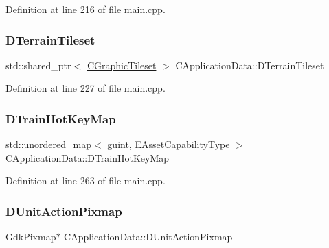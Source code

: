 Definition at line 216 of file main.\+cpp.

\hypertarget{classCApplicationData_acd9fb0d0ea35a6d93e8ec9212db8ef83}{}\label{classCApplicationData_acd9fb0d0ea35a6d93e8ec9212db8ef83} 
\subsubsection{\texorpdfstring{D\+Terrain\+Tileset}{DTerrainTileset}}
{\footnotesize\ttfamily std\+::shared\+\_\+ptr$<$ \hyperlink{classCGraphicTileset}{C\+Graphic\+Tileset} $>$ C\+Application\+Data\+::\+D\+Terrain\+Tileset\hspace{0.3cm}{\ttfamily [protected]}}



Definition at line 227 of file main.\+cpp.

\hypertarget{classCApplicationData_a35798136764b6d2ede555494752e83eb}{}\label{classCApplicationData_a35798136764b6d2ede555494752e83eb} 
\subsubsection{\texorpdfstring{D\+Train\+Hot\+Key\+Map}{DTrainHotKeyMap}}
{\footnotesize\ttfamily std\+::unordered\+\_\+map$<$ guint, \hyperlink{GameDataTypes_8h_a35b98ce26aca678b03c6f9f76e4778ce}{E\+Asset\+Capability\+Type} $>$ C\+Application\+Data\+::\+D\+Train\+Hot\+Key\+Map\hspace{0.3cm}{\ttfamily [protected]}}



Definition at line 263 of file main.\+cpp.

\hypertarget{classCApplicationData_ae264356c833cd581093e3b373cce6620}{}\label{classCApplicationData_ae264356c833cd581093e3b373cce6620} 
\subsubsection{\texorpdfstring{D\+Unit\+Action\+Pixmap}{DUnitActionPixmap}}
{\footnotesize\ttfamily Gdk\+Pixmap$\ast$ C\+Application\+Data\+::\+D\+Unit\+Action\+Pixmap\hspace{0.3cm}{\ttfamily [protected]}}



